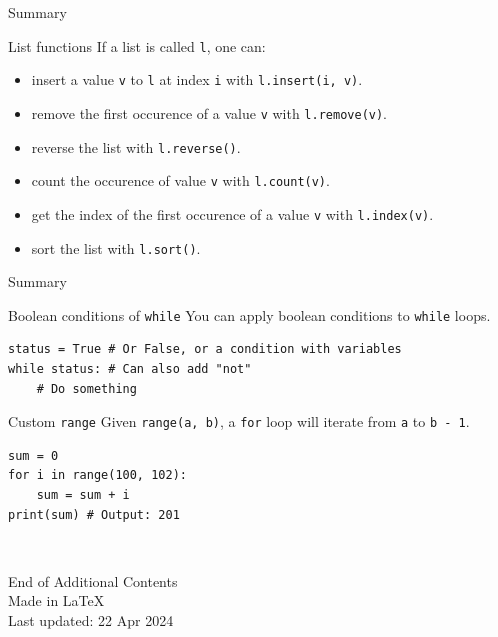 \documentclass[dvipsnames, svgnames, x11names, handout]{beamer}
\begin{document}
\begin{frame}[fragile]{Summary}
\begin{block}{List functions}
If a list is called \texttt{l}, one can:
\begin{itemize}
    \item insert a value \texttt{v} to \texttt{l} at index \texttt{i} with \texttt{l.insert(i, v)}.
    \item remove the first occurence of a value \texttt{v} with \texttt{l.remove(v)}.
    \item reverse the list with \texttt{l.reverse()}.
    \item count the occurence of value \texttt{v} with \texttt{l.count(v)}.
    \item get the index of the first occurence of a value \texttt{v} with \texttt{l.index(v)}.
    \item sort the list with \texttt{l.sort()}.
\end{itemize}
\end{block}

\end{frame}

\begin{frame}[fragile]{Summary}
\begin{block}{Boolean conditions of \texttt{while}}
You can apply boolean conditions to \texttt{while} loops.
\begin{verbatim}
status = True # Or False, or a condition with variables
while status: # Can also add "not"
    # Do something
\end{verbatim}
\end{block}

\begin{block}{Custom \texttt{range}}
Given \texttt{range(a, b)}, a \texttt{for} loop will iterate from \texttt{a} to \texttt{b - 1}.
\begin{verbatim}
sum = 0
for i in range(100, 102):
    sum = sum + i
print(sum) # Output: 201
\end{verbatim}
\end{block}
    
\end{frame}

\begin{frame}{ \ }
	\begin{center}
		End of Additional Contents\\
		Made in \LaTeX\\
		Last updated: 22 Apr 2024
	\end{center}
\end{frame}
\end{document}
